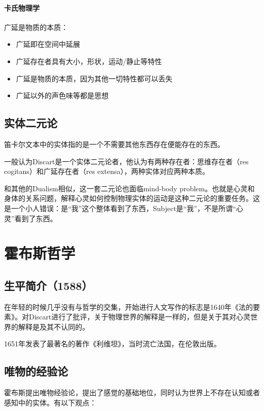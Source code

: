 \documentclass{ctexart}
\begin{document}
\paragraph{卡氏物理学}

广延是物质的本质：

\begin{itemize}
    \item 广延即在空间中延展
    \item 广延存在者具有大小，形状，运动/静止等特性
    \item 广延是物质的本质，因为其他一切特性都可以丢失
    \item 广延以外的声色味等都是思想
\end{itemize}

\subsection{实体二元论}

笛卡尔文本中的实体指的是一个不需要其他东西存在便能存在的东西。

一般认为Discart是一个实体二元论者，他认为有两种存在者：思维存在者（res cogitans）和广延存在者（res extensa），两种实体对应两种本质。

和其他的Dualism相似，这一套二元论也面临mind-body problem。也就是心灵和身体的关系问题，解释心灵如何控制物理实体的运动是这种二元论的重要任务。这是一个小人错误：是“我”这个整体看到了东西，Subject是“我”，不是所谓“心灵”看到了东西。

\section{霍布斯哲学}

\subsection{生平简介（1588）}

在年轻的时候几乎没有与哲学的交集，开始进行人文写作的标志是1640年《法的要素》。对Discart进行了批评，关于物理世界的解释是一样的，但是关于其对心灵世界的解释是及其不认同的。

1651年发表了最著名的著作《利维坦》，当时流亡法国，在伦敦出版。

\subsection{唯物的经验论}

霍布斯提出唯物经验论，提出了感觉的基础地位，同时认为世界上不存在认知或者感知中的实体。有以下观点：
\end{document}
